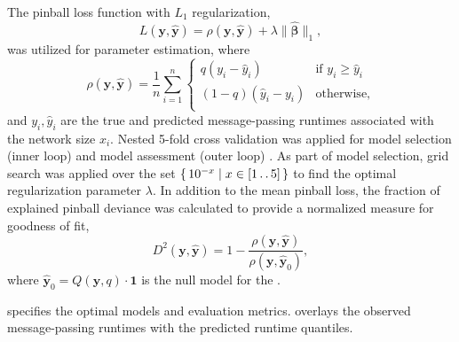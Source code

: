 The pinball loss function \citep{Takeuchi2006} with $L_1$ regularization,
\begin{equation*}
  L(\mathbf{y}, \hat{\mathbf{y}}) = \rho(\mathbf{y}, \hat{\mathbf{y}}) + \lambda \|\hat{\boldsymbol{\beta}} \|_1,
\end{equation*}
was utilized for parameter estimation, where
\begin{equation*}
  \rho(\mathbf{y}, \hat{\mathbf{y}}) = \frac{1}{n} \sum_{i=1}^{n} \begin{cases}
    q(y_i - \hat{y}_i) & \text{if $y_i \geq \hat{y}_i$} \\
    (1 - q)(\hat{y}_i - y_i) & \text{otherwise}, \\
  \end{cases}
\end{equation*}
and $y_i, \hat{y}_i$ are the true and predicted message-passing runtimes associated with the network size $x_i$. Nested 5-fold cross validation \citep{Cawley2010} was applied for model selection (inner loop) and model assessment (outer loop) \cite[p. 222]{Hastie2009}. As part of model selection, grid search was applied over the set $\set{ 10^{-x} | x \in [1 \mathinner{\ldotp \ldotp} 5]}$ to find the optimal regularization parameter $\lambda$. In addition to the mean pinball loss, the fraction of explained pinball deviance \citep{Koenker1999, Hastie2015} was calculated to provide a normalized measure for goodness of fit,
\begin{equation*}
  D^2(\mathbf{y}, \hat{\mathbf{y}}) = 1 - \frac{\rho(\mathbf{y}, \hat{\mathbf{y}})}{\rho(\mathbf{y}, \hat{\mathbf{y}}_0)},
\end{equation*}
where $\hat{\mathbf{y}}_0 = Q(\mathbf{y}, q) \cdot \mathbf{1}$ is the null model for the .

 specifies the optimal models and evaluation metrics.  overlays the observed message-passing runtimes with the predicted runtime quantiles.

